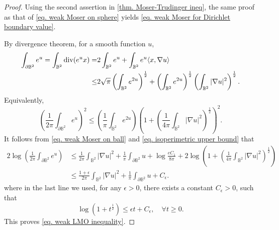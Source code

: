 \documentclass[11pt,a4paper,twoside]{amsart}
\newtheorem{sketch proof}{Sketch of the proof}[section]
\begin{document}
\begin{proof}
    Using the second assertion in \cref{thm. Moser-Trudinger ineq}, the same proof as that of \cref{eq. weak Moser on sphere}  yields \cref{eq. weak Moser for Dirichlet boundary value}.
 

    By divergence theorem, for a smooth function $u$,
    \begin{align*}
        \int_{\partial\mathbb{B}^2}e^u
    =\int_{\mathbb{B}^2}\operatorname{div}(e^ux)
    =&2\int_{\mathbb{B}^2}e^u
    +\int_{\mathbb{B}^2}e^u\langle x,\nabla u\rangle\notag\\
    \leq& 2\sqrt{\pi}
    \left(
    \int_{\mathbb{B}^2} e^{2u}
    \right)^{\frac{1}{2}}
    +\left(
    \int_{\mathbb{B}^2} e^{2u}
    \right)^{\frac{1}{2}}
    \left(
    \int_{\mathbb{B}^2} |\nabla u|^2
    \right)^{\frac{1}{2}}.
    \end{align*}
    Equivalently,
    \begin{equation}\label{eq. isoperimetric upper bound}
        \left(
        \frac{1}{2\pi}
        \int_{\partial \mathbb{B}^2}e^{u}
        \right)^2
        \leq \left(
        \frac{1}{\pi}\int_{\mathbb{B}^2}e^{2u}
        \right)
        \left(1+
        \left(\frac{1}{4\pi}
        \int_{\mathbb{B}^2}|\nabla u|^2\right)^{\frac{1}{2}}\right)^2.
    \end{equation}
    It follows from \cref{eq. weak Moser on ball} and \cref{eq. isoperimetric upper bound} that
    \begin{align*}
        2\log\left(
        \frac{1}{2\pi}
        \int_{\partial \mathbb{B}^2}e^{u}
        \right)
        & \leq 
        \frac{1}{2\pi}\int_{\mathbb{B}^2}
        |\nabla u|^2
        +\frac{1}{\pi}
        \int_{\partial\mathbb{B}^2} u
        +\log\frac{eC_1}{8\pi}
        +2\log
        \left(1+
        \left(\frac{1}{4\pi}
        \int_{\mathbb{B}^2}|\nabla u|^2\right)^{\frac{1}{2}}\right)\\[2mm]
        & \leq 
        \frac{1+\epsilon}{2\pi}\int_{\mathbb{B}^2}
        |\nabla u|^2
        +\frac{1}{\pi}
        \int_{\partial\mathbb{B}^2} u
        +C_\epsilon.
    \end{align*}
    where in the last line we used, for any $\epsilon>0$, there exists a constant $C_\epsilon>0$, such that
    \[
    \log(1+t^{\frac{1}{2}})
    \leq \epsilon t+C_\epsilon,\quad \forall t\geq 0.
    \]
    This proves \cref{eq. weak LMO inequality}.
\end{proof}
\end{document}
